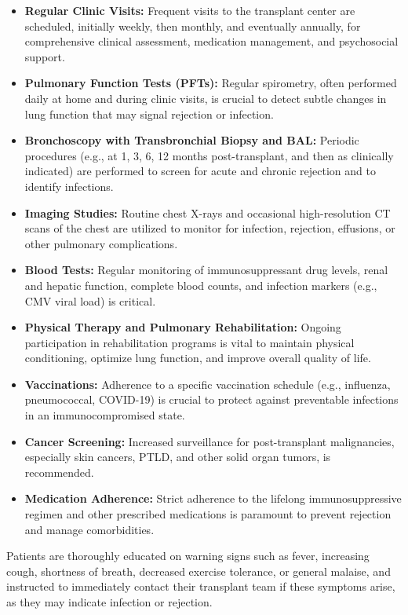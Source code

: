 \begin{itemize}
  \item \textbf{Regular Clinic Visits:} Frequent visits to the transplant center are scheduled, initially weekly, then monthly, and eventually annually, for comprehensive clinical assessment, medication management, and psychosocial support.
  \item \textbf{Pulmonary Function Tests (PFTs):} Regular spirometry, often performed daily at home and during clinic visits, is crucial to detect subtle changes in lung function that may signal rejection or infection.
  \item \textbf{Bronchoscopy with Transbronchial Biopsy and BAL:} Periodic procedures (e.g., at 1, 3, 6, 12 months post-transplant, and then as clinically indicated) are performed to screen for acute and chronic rejection and to identify infections.
  \item \textbf{Imaging Studies:} Routine chest X-rays and occasional high-resolution CT scans of the chest are utilized to monitor for infection, rejection, effusions, or other pulmonary complications.
  \item \textbf{Blood Tests:} Regular monitoring of immunosuppressant drug levels, renal and hepatic function, complete blood counts, and infection markers (e.g., CMV viral load) is critical.
  \item \textbf{Physical Therapy and Pulmonary Rehabilitation:} Ongoing participation in rehabilitation programs is vital to maintain physical conditioning, optimize lung function, and improve overall quality of life.
  \item \textbf{Vaccinations:} Adherence to a specific vaccination schedule (e.g., influenza, pneumococcal, COVID-19) is crucial to protect against preventable infections in an immunocompromised state.
  \item \textbf{Cancer Screening:} Increased surveillance for post-transplant malignancies, especially skin cancers, PTLD, and other solid organ tumors, is recommended.
  \item \textbf{Medication Adherence:} Strict adherence to the lifelong immunosuppressive regimen and other prescribed medications is paramount to prevent rejection and manage comorbidities.
\end{itemize}
Patients are thoroughly educated on warning signs such as fever, increasing cough, shortness of breath, decreased exercise tolerance, or general malaise, and instructed to immediately contact their transplant team if these symptoms arise, as they may indicate infection or rejection.

